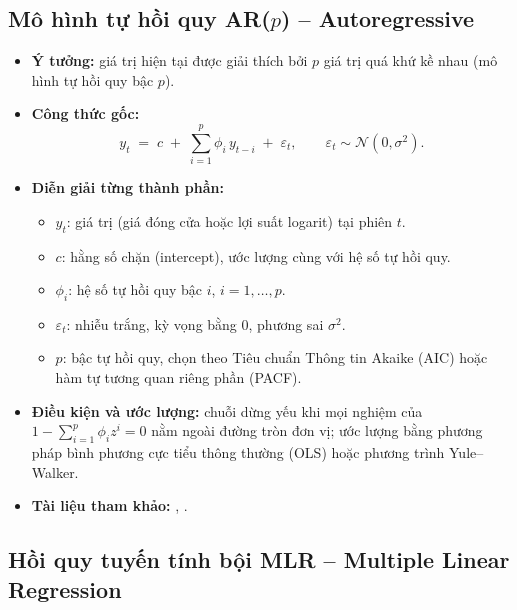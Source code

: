 \documentclass[12pt,a4paper,openany,oneside]{report}
\numberwithin{equation}{chapter}
\begin{document}
\subsection{Mô hình tự hồi quy AR($p$) -- Autoregressive}

\begin{itemize}[leftmargin=18pt,topsep=2pt,itemsep=4pt]
  \item \textbf{Ý tưởng:} giá trị hiện tại được giải thích bởi $p$ giá
        trị quá khứ kề nhau (mô hình tự hồi quy bậc $p$).
  \item \textbf{Công thức gốc:}
        \begin{equation}
          y_t \;=\; c \;+\; \sum_{i=1}^{p}\phi_i\, y_{t-i} \;+\; \varepsilon_t,
          \qquad \varepsilon_t \sim \mathcal{N}(0,\sigma^2).
          \label{eq:ar}
        \end{equation}
  \item \textbf{Diễn giải từng thành phần:}
        \begin{itemize}[leftmargin=14pt,topsep=2pt,itemsep=1pt]
          \item $y_t$: giá trị (giá đóng cửa hoặc lợi suất logarit) tại phiên $t$.
          \item $c$: hằng số chặn (intercept), ước lượng cùng với hệ số tự hồi quy.
          \item $\phi_i$: hệ số tự hồi quy bậc $i$, $i = 1,\dots,p$.
          \item $\varepsilon_t$: nhiễu trắng, kỳ vọng bằng 0, phương sai $\sigma^2$.
          \item $p$: bậc tự hồi quy, chọn theo Tiêu chuẩn Thông tin
                Akaike (AIC) \citep{Akaike1974} hoặc hàm tự tương quan
                riêng phần (PACF).
        \end{itemize}
  \item \textbf{Điều kiện và ước lượng:} chuỗi dừng yếu khi mọi nghiệm
        của $1 - \sum_{i=1}^{p}\phi_i z^i = 0$ nằm ngoài đường tròn
        đơn vị; ước lượng bằng phương pháp bình phương cực tiểu thông
        thường (OLS) hoặc phương trình Yule--Walker.
  \item \textbf{Tài liệu tham khảo:} \citet{BoxJenkins1970}, \citet{Akaike1974}.
\end{itemize}

\subsection{Hồi quy tuyến tính bội MLR -- Multiple Linear Regression}
\end{document}
